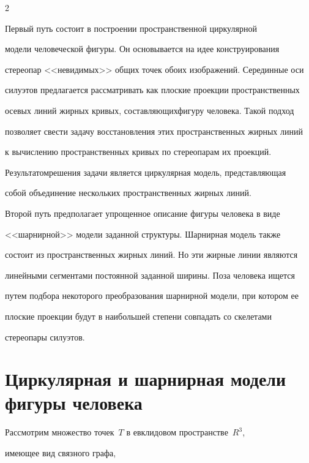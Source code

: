 \begin{multicols}{2}
     

     Первый путь состоит в построении пространственной циркулярной 

модели человеческой фигуры. Он основывается на идее конструирования 

стереопар <<невидимых>> общих точек обоих изоб\-ра\-же\-ний. Серединные оси 

силуэтов предлагается рассматривать как плоские проекции пространственных 

осевых линий жирных кривых, составляющих\linebreak фигуру человека. Такой подход 

позволяет свести задачу восстановления этих пространственных жирных линий 

к вычислению пространственных кривых по стереопарам их проекций. 

Результатом\linebreak решения задачи является циркулярная модель, представляющая 

собой объединение нескольких пространственных жирных линий. 

     

     Второй путь предполагает упрощенное описание фигуры человека в виде 

<<шарнирной>> модели заданной структуры. Шарнирная модель также 

состоит из пространственных жирных линий. Но эти жирные линии являются 

линейными сегментами постоянной заданной ширины. Поза человека ищется 

путем подбора некоторого преобразования шарнирной модели, при котором ее 

плоские проекции будут в наибольшей степени совпадать со скелетами 

стереопары силуэтов. 



\vspace*{-12pt}



\section{Циркулярная и шарнирная модели фигуры человека}



     Рассмотрим множество точек~$T$ в евклидовом пространстве~$R^3$, 

имеющее вид связного графа,\linebreak




\end{multicols}
